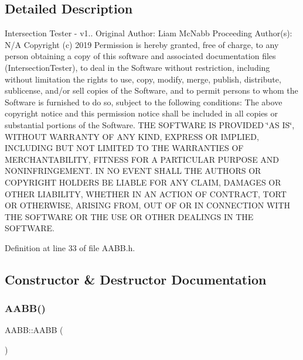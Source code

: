 \subsection{Detailed Description}
Intersection Tester -\/ v1.. Original Author\+: Liam Mc\+Nabb Proceeding Author(s)\+: N/A Copyright (c) 2019 Permission is hereby granted, free of charge, to any person obtaining a copy of this software and associated documentation files (Intersection\+Tester), to deal in the Software without restriction, including without limitation the rights to use, copy, modify, merge, publish, distribute, sublicense, and/or sell copies of the Software, and to permit persons to whom the Software is furnished to do so, subject to the following conditions\+: The above copyright notice and this permission notice shall be included in all copies or substantial portions of the Software. T\+HE S\+O\+F\+T\+W\+A\+RE IS P\+R\+O\+V\+I\+D\+ED \char`\"{}\+A\+S I\+S\char`\"{}, W\+I\+T\+H\+O\+UT W\+A\+R\+R\+A\+N\+TY OF A\+NY K\+I\+ND, E\+X\+P\+R\+E\+SS OR I\+M\+P\+L\+I\+ED, I\+N\+C\+L\+U\+D\+I\+NG B\+UT N\+OT L\+I\+M\+I\+T\+ED TO T\+HE W\+A\+R\+R\+A\+N\+T\+I\+ES OF M\+E\+R\+C\+H\+A\+N\+T\+A\+B\+I\+L\+I\+TY, F\+I\+T\+N\+E\+SS F\+OR A P\+A\+R\+T\+I\+C\+U\+L\+AR P\+U\+R\+P\+O\+SE A\+ND N\+O\+N\+I\+N\+F\+R\+I\+N\+G\+E\+M\+E\+NT. IN NO E\+V\+E\+NT S\+H\+A\+LL T\+HE A\+U\+T\+H\+O\+RS OR C\+O\+P\+Y\+R\+I\+G\+HT H\+O\+L\+D\+E\+RS BE L\+I\+A\+B\+LE F\+OR A\+NY C\+L\+A\+IM, D\+A\+M\+A\+G\+ES OR O\+T\+H\+ER L\+I\+A\+B\+I\+L\+I\+TY, W\+H\+E\+T\+H\+ER IN AN A\+C\+T\+I\+ON OF C\+O\+N\+T\+R\+A\+CT, T\+O\+RT OR O\+T\+H\+E\+R\+W\+I\+SE, A\+R\+I\+S\+I\+NG F\+R\+OM, O\+UT OF OR IN C\+O\+N\+N\+E\+C\+T\+I\+ON W\+I\+TH T\+HE S\+O\+F\+T\+W\+A\+RE OR T\+HE U\+SE OR O\+T\+H\+ER D\+E\+A\+L\+I\+N\+GS IN T\+HE S\+O\+F\+T\+W\+A\+RE. 

Definition at line 33 of file A\+A\+B\+B.\+h.



\subsection{Constructor \& Destructor Documentation}
\mbox{\label{class_a_a_b_b_a5f5baf6c533905aa1456b3a3eb57bab2}} 
\subsubsection{\texorpdfstring{A\+A\+B\+B()}{AABB()}\hspace{0.1cm}{\footnotesize\ttfamily [1/4]}}
{\footnotesize\ttfamily A\+A\+B\+B\+::\+A\+A\+BB (\begin{DoxyParamCaption}{ }\end{DoxyParamCaption})}



